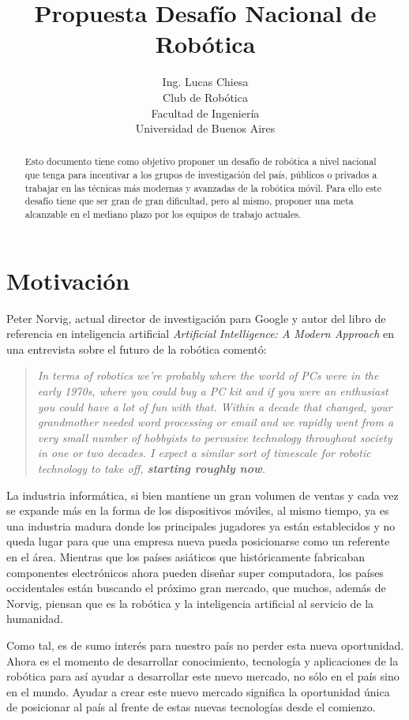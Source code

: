 \documentclass[a4paper,12pt]{article}
\author{Ing. Lucas Chiesa \\ Club de Robótica \\ Facultad de Ingeniería \\ Universidad de Buenos Aires}
\title{Propuesta Desafío Nacional de Robótica}
\begin{document}
\maketitle

\begin{abstract}
 Esto documento tiene como objetivo proponer un desafío de robótica a nivel nacional que tenga para incentivar a los grupos de investigación del país, públicos o privados a trabajar en las técnicas más modernas y avanzadas de la robótica móvil. Para ello este desafío tiene que ser gran de gran dificultad, pero al mismo, proponer una meta alcanzable en el mediano plazo por los equipos de trabajo actuales.
\end{abstract}

\newpage
\section{Motivación}

Peter Norvig, actual director de investigación para Google y autor del libro de referencia en inteligencia artificial \textit{Artificial Intelligence: A Modern Approach} en una entrevista sobre el futuro de la robótica comentó:

\begin{quote}
\textit{In terms of robotics we’re probably where the world of PCs were in the early 1970s, where you could buy a PC kit and if you were an enthusiast you could have a lot of fun with that. Within a decade that changed, your grandmother needed word processing or email and we rapidly went from a very small number of hobbyists to pervasive technology throughout society in one or two decades. I expect a similar sort of timescale for robotic technology to take off, \textbf{starting roughly now}.}
\end{quote}

La industria informática, si bien mantiene un gran volumen de ventas y cada vez se expande más en la forma de los dispositivos móviles, al mismo tiempo, ya es una industria madura donde los principales jugadores ya están establecidos y no queda lugar para que una empresa nueva pueda posicionarse como un referente en el área. Mientras que los países asiáticos que históricamente fabricaban componentes electrónicos ahora pueden diseñar super computadora, los países occidentales están buscando el próximo gran mercado, que muchos, además de Norvig, piensan que es la robótica y la inteligencia artificial al servicio de la humanidad.

Como tal, es de sumo interés para nuestro país no perder esta nueva oportunidad. Ahora es el momento de desarrollar conocimiento, tecnología y aplicaciones de la robótica para así ayudar a desarrollar este nuevo mercado, no sólo en el país sino en el mundo. Ayudar a crear este nuevo mercado significa la oportunidad única de posicionar al país al frente de estas nuevas tecnologías desde el comienzo.
 
\end{document}
